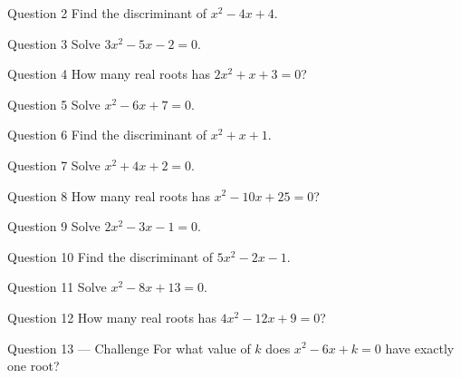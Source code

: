\documentclass[11pt]{article}
\begin{document}
\begin{qbox}{Question 2}
Find the discriminant of $x^2-4x+4$.\workspace{2.4cm}
\end{qbox}

\begin{qbox}{Question 3}
Solve $3x^2-5x-2=0$.\workspace{2.4cm}
\end{qbox}

\begin{qbox}{Question 4}
How many real roots has $2x^2+x+3=0$?\workspace{2.4cm}
\end{qbox}

\begin{qbox}{Question 5}
Solve $x^2-6x+7=0$.\workspace{2.4cm}
\end{qbox}

\begin{qbox}{Question 6}
Find the discriminant of $x^2+x+1$.\workspace{2.4cm}
\end{qbox}

\begin{qbox}{Question 7}
Solve $x^2+4x+2=0$.\workspace{2.4cm}
\end{qbox}

\begin{qbox}{Question 8}
How many real roots has $x^2-10x+25=0$?\workspace{2.4cm}
\end{qbox}

\begin{qbox}{Question 9}
Solve $2x^2-3x-1=0$.\workspace{2.4cm}
\end{qbox}

\begin{qbox}{Question 10}
Find the discriminant of $5x^2-2x-1$.\workspace{2.4cm}
\end{qbox}

\begin{qbox}{Question 11}
Solve $x^2-8x+13=0$.\workspace{2.4cm}
\end{qbox}

\begin{qbox}{Question 12}
How many real roots has $4x^2-12x+9=0$?\workspace{2.4cm}
\end{qbox}

\begin{qbox}{Question 13 --- Challenge}
For what value of $k$ does $x^2-6x+k=0$ have exactly one root?\workspace{3cm}
\end{qbox}

\clearpage
{}
\end{document}
